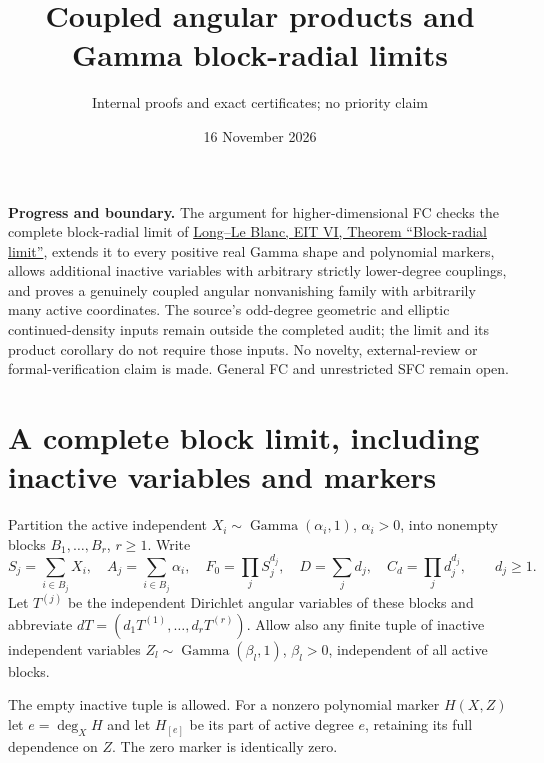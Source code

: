 \documentclass[11pt]{article}
\title{Coupled angular products and Gamma block-radial limits}
\author{Internal proofs and exact certificates; no priority claim}
\date{16 November 2026}
\begin{document}
\maketitle
\noindent\textbf{Progress and boundary.}
The argument for higher-dimensional FC checks the complete block-radial limit of
\href{sources/long-eit-vi-current.tex}{Long--Le Blanc, EIT VI,
Theorem ``Block-radial limit''}, extends it to every positive real Gamma
shape and polynomial markers, allows additional inactive variables with
arbitrary strictly lower-degree couplings, and proves a genuinely coupled angular
nonvanishing family with arbitrarily many active coordinates.
The source's odd-degree geometric and elliptic continued-density inputs
remain outside the completed audit; the limit and its product corollary
do not require those inputs. No novelty, external-review or formal-verification
claim is made. General FC and unrestricted SFC remain open.

\section{A complete block limit, including inactive variables and markers}
Partition the active independent $X_i\sim\operatorname{Gamma}(\alpha_i,1)$,
$\alpha_i>0$, into nonempty blocks $B_1,\ldots,B_r$, $r\geq1$. Write
\[
 S_j=\sum_{i\in B_j}X_i,\quad A_j=\sum_{i\in B_j}\alpha_i,
 \quad F_0=\prod_j S_j^{d_j},\quad D=\sum_jd_j,
 \quad C_d=\prod_jd_j^{d_j},\qquad d_j\geq1.
\]
Let $T^{(j)}$ be the independent Dirichlet angular variables of these
blocks and abbreviate $dT=(d_1T^{(1)},\ldots,d_rT^{(r)})$.
Allow also any finite tuple of inactive independent variables
$Z_l\sim\operatorname{Gamma}(\beta_l,1)$, $\beta_l>0$, independent of
all active blocks.

The empty inactive tuple is allowed.
For a nonzero polynomial marker $H(X,Z)$ let $e=\deg_XH$ and let
$H_{[e]}$ be its part of active degree $e$, retaining its full dependence
on $Z$. The zero marker is identically zero.
\end{document}
